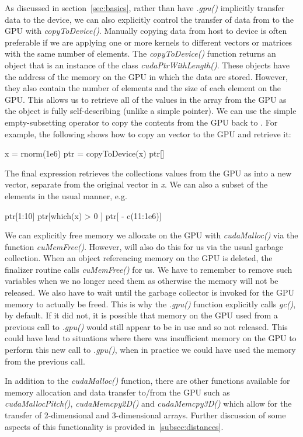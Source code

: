 \documentclass[article]{jss}
\def\R{\proglang{R}}
\def\Rfunc#1{\textsl{#1()}}
\def\Rvar#1{\textsl{#1}}
\def\Cfunc#1{\textit{#1()}}
\begin{document}
As discussed in section~\ref{sec:basics}, rather than have \Rfunc{.gpu}
implicitly transfer data to the device, we can also explicitly control
the transfer of data from \R{} to the GPU with \Rfunc{copyToDevice}.
Manually copying data from host to device is often preferable if
we are applying one or more kernels to different \R{} vectors or matrices
with the same number of elements. The \Rfunc{copyToDevice} function 
returns an object that is an instance
of the class \Rfunc{cudaPtrWithLength}.  These objects have the
address of the memory on the GPU in which the data are
stored. However, they also contain the number of elements and the size
of each element on the GPU.  This allows us to retrieve all of the
values in the array from the GPU as the object is fully
self-describing (unlike a simple pointer).
We can use the simple empty-subsetting operator to copy the
contents from the GPU back to \R. For example, the following
shows how to copy an \R{} vector to the GPU and retrieve it:
\begin{RCode}
x = rnorm(1e6)
ptr = copyToDevice(x)
ptr[]
\end{RCode}
The final expression retrieves the collections values from the GPU as
into a new \R{} vector, separate from the original vector in \Rvar{x}.
We can also a subset of the  elements in the usual manner, e.g.
\begin{RCode}
ptr[1:10]
ptr[which(x) > 0 ]
ptr[ - c(11:1e6)]
\end{RCode}

We can explicitly free memory we allocate on the GPU with
\Rfunc{cudaMalloc} via the function \Rfunc{cuMemFree}.  However, \R{}
will also do this for us via the usual garbage collection.  When an \R{}
object referencing memory on the GPU is deleted, the finalizer routine
calls \Cfunc{cuMemFree} for us.  We have to remember to remove such
variables when we no longer need them as otherwise the memory will not
be released.  We also have to wait until the \R{} garbage collector is
invoked for the GPU memory to actually be freed.  This is why the
\Rfunc{.gpu} function explicitly calls \Rfunc{gc}, by default. If it
did not, it is possible that memory on the GPU used from a previous
call to \Rfunc{.gpu} would still appear to be in use and so not
released. This could have lead to situations where there was 
insufficient memory on the GPU to perform this new call to \Rfunc{.gpu},
when in practice we could have used the memory from the previous call.

In addition to the \Rfunc{cudaMalloc} function, there
are other functions available for memory allocation and data transfer to/from
the GPU such as \Rfunc{cudaMallocPitch}, \Rfunc{cudaMemcpy2D} 
and \Rfunc{cudaMemcpy3D} which allow for the transfer of 
2-dimensional and 3-dimensional arrays. Further discussion
of some aspects of this functionality is provided in~\ref{subsec:distances}.
\end{document}
